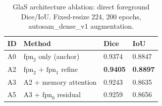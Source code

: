 \begin{table}[htbp]
  \centering
  \small
  \begin{tabular}{llll}
  \toprule
  \textbf{ID} & \textbf{Method} & \textbf{Dice} & \textbf{IoU} \\
  \midrule
  A0 & $\text{fpn}_2$ only (anchor) & 0.9374 & 0.8847 \\
  A2 & $\text{fpn}_2$ + $\text{fpn}_1$ refine & \textbf{0.9405} & \textbf{0.8897} \\
  A3 & A2 + memory attention & 0.9243 & 0.8635 \\
  A5 & A3 + $\text{fpn}_0$ residual & 0.9259 & 0.8656 \\
  \bottomrule
  \end{tabular}
  \caption{GlaS architecture ablation: direct foreground Dice/IoU. Fixed-resize 224, 200 epochs, autosam\_dense\_v1 augmentation.}
  \label{tab:glas_ablation}
\end{table}
